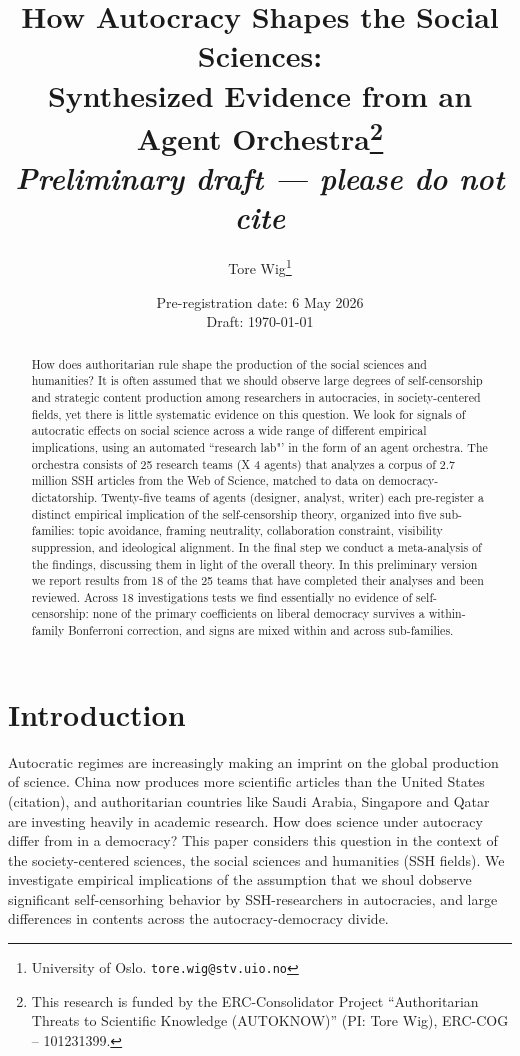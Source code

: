 \documentclass[12pt,a4paper]{article}
\title{\textbf{How Autocracy Shapes the Social Sciences:\\
Synthesized Evidence from an Agent Orchestra}\thanks{This research is funded by the ERC-Consolidator Project ``Authoritarian Threats to Scientific Knowledge (AUTOKNOW)'' (PI: Tore Wig), ERC-COG -- 101231399.}\\[0.5em]
\large\normalfont\textit{Preliminary draft --- please do not cite}}
\author{Tore Wig\thanks{University of Oslo. \texttt{tore.wig@stv.uio.no}}
\and \todo{co-authors TBD}}
\date{Pre-registration date: 6 May 2026\\
\small Draft: \today}
\begin{document}
\maketitle
\onehalfspacing

\begin{abstract}
How does authoritarian rule shape the production of the social sciences and humanities? It is often assumed that we should observe large degrees of self-censorship and strategic content production among researchers in autocracies, in society-centered fields, yet there is little systematic evidence on this question. We look for signals of autocratic effects on social science across a wide range of different empirical implications, using an automated ``research lab"' in the form of an agent orchestra. The orchestra consists of 25 research teams (X 4 agents) that analyzes a corpus of 2.7 million SSH articles from the Web of Science, matched to data on democracy-dictatorship. Twenty-five teams of agents (designer, analyst, writer) each pre-register a distinct empirical implication of the self-censorship theory, organized into five sub-families: topic avoidance, framing neutrality, collaboration constraint, visibility suppression, and ideological alignment. In the final step we conduct a meta-analysis of the findings, discussing them in light of the overall theory. In this preliminary version we report results from 18 of the 25 teams that have completed their analyses and been reviewed. Across 18 investigations tests we find essentially no evidence of self-censorship: none of the primary coefficients on liberal democracy survives a within-family Bonferroni correction, and signs are mixed within and across sub-families.
\end{abstract}

\tableofcontents
\clearpage

\section{Introduction}
\label{sec:intro}
Autocratic regimes are increasingly making an imprint on the global production of science. China now produces more scientific articles than the United States (citation), and authoritarian countries like Saudi Arabia, Singapore and Qatar are investing heavily in academic research. How does science under autocracy differ from in a democracy? This paper considers this question in the context of the society-centered sciences, the social sciences and humanities (SSH fields). We investigate empirical implications of the assumption that we shoul dobserve significant self-censorhing behavior by SSH-researchers in autocracies, and large differences in contents across the autocracy-democracy divide.
\end{document}
